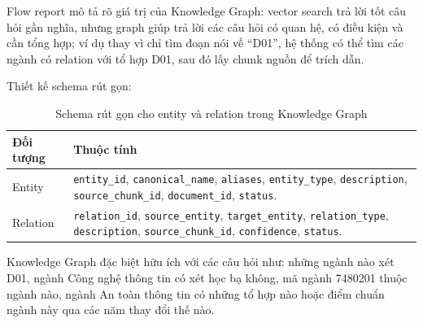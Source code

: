 Flow report mô tả rõ giá trị của Knowledge Graph: vector search trả lời tốt câu hỏi gần nghĩa, nhưng graph giúp trả lời các câu hỏi có quan hệ, có điều kiện và cần tổng hợp; ví dụ thay vì chỉ tìm đoạn nói về ``D01'', hệ thống có thể tìm các ngành có relation với tổ hợp D01, sau đó lấy chunk nguồn để trích dẫn.

Thiết kế schema rút gọn:

\begin{table}[H]
\centering
\begin{tabular}{|p{3.8cm}|p{9cm}|}
\hline
\textbf{Đối tượng} & \textbf{Thuộc tính} \\
\hline
Entity & \texttt{entity\_id}, \texttt{canonical\_name}, \texttt{aliases}, \texttt{entity\_type}, \texttt{description}, \texttt{source\_chunk\_id}, \texttt{document\_id}, \texttt{status}. \\
\hline
Relation & \texttt{relation\_id}, \texttt{source\_entity}, \texttt{target\_entity}, \texttt{relation\_type}, \texttt{description}, \texttt{source\_chunk\_id}, \texttt{confidence}, \texttt{status}. \\
\hline
\end{tabular}
\caption{Schema rút gọn cho entity và relation trong Knowledge Graph}
\label{tab:rag-kg-schema}
\end{table}

Knowledge Graph đặc biệt hữu ích với các câu hỏi như: những ngành nào xét D01, ngành Công nghệ thông tin có xét học bạ không, mã ngành 7480201 thuộc ngành nào, ngành An toàn thông tin có những tổ hợp nào hoặc điểm chuẩn ngành này qua các năm thay đổi thế nào.
